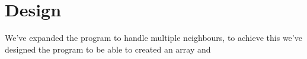 \section{Design}
We've expanded the program to handle multiple neighbours,
to achieve this we've designed the program to be able to created an array and
